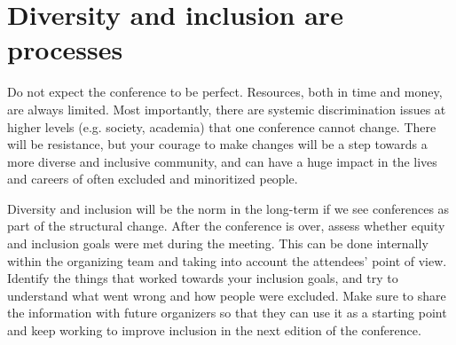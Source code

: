 \documentclass[10pt,letterpaper]{article}
\begin{document}


\section{Diversity and inclusion are processes}
\label{rule_process}

Do not expect the conference to be perfect. 
Resources, both in time and money, are always limited. 
Most importantly, there are systemic discrimination issues at higher levels (e.g. society, academia) that one conference cannot change. 
There will be resistance, but your courage to make changes will be a step towards a more diverse and inclusive community, and can have a huge impact in the lives and careers of often excluded and minoritized people.

Diversity and inclusion will be the norm in the long-term if we see conferences as part of the structural change. 
After the conference is over, assess whether equity and inclusion goals were met during the meeting. 
This can be done internally within the organizing team and taking into account the attendees' point of view. 
Identify the things that worked towards your inclusion goals, and try to understand what went wrong and how people were excluded.
Make sure to share the information with future organizers so that they can use it as a starting point and keep working to improve inclusion in the next edition of the conference. 

\end{document}
